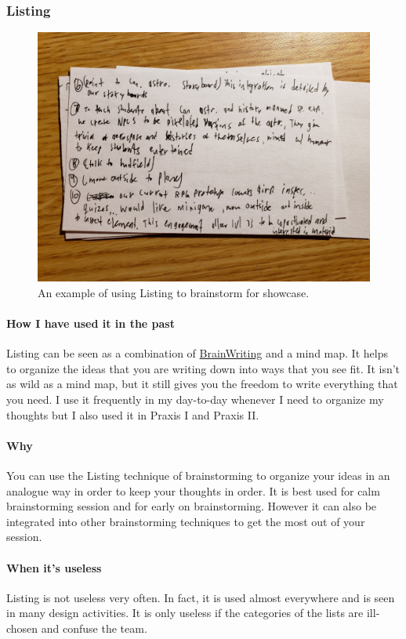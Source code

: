 \documentclass[paper=a4, fontsize=11pt]{article} %
\newcommand{\raisetarget}[2]%
{\bgroup
  \sbox0{#2}%
  \raisebox{\ht0}{\hypertarget{#1}{}}\usebox0%
\egroup}
\begin{document}
        \raisetarget{listlink}{}    
        \subsubsection{Listing}
            \begin{figure}[H]
                \centering
	            \includegraphics[width=0.6\linewidth]{list2.jpg}
	            \caption{An example of using Listing to brainstorm for showcase.}
            \end{figure}
            \paragraph{How I have used it in the past}
            \cite{listing} Listing can be seen as a combination of \hyperlink{bwlink}{BrainWriting} and a mind map. It helps to organize the ideas that you are writing down into ways that you see fit. It isn't as wild as a mind map, but it still gives you the freedom to write everything that you need. I use it frequently in my day-to-day whenever I need to organize my thoughts but I also used it in Praxis I and Praxis II.
            \paragraph{Why}
            You can use the Listing technique of brainstorming to organize your ideas in an analogue way in order to keep your thoughts in order. It is best used for calm brainstorming session and for early on brainstorming. However it can also be integrated into other brainstorming techniques to get the most out of your session.
            \paragraph{When it's useless}
            Listing is not useless very often. In fact, it is used almost everywhere and is seen in many design activities. It is only useless if the categories of the lists are ill-chosen and confuse the team.
\end{document}
